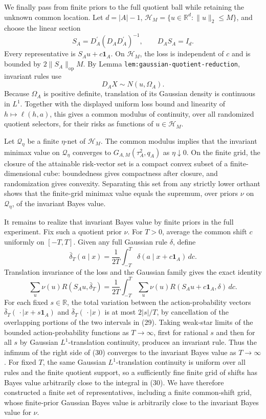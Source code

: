 We finally pass from finite priors to the full quotient ball while retaining the unknown common location.  Let \(d=|A|-1\), \(\mathcal H_M=\{u\in\mathbb R^d:\lVert u\rVert_2\leq M\}\), and choose the linear section
\[
S_A=D_A^{\prime}(D_AD_A^{\prime})^{-1},
\qquad D_AS_A=I_d.
\tag{27}
\]
Every representative is \(S_Au+c\mathbf1_A\).  On \(\mathcal H_M\), the loss is independent of \(c\) and is bounded by \(2\lVert S_A\rVert_{\mathrm{op}}M\).  By Lemma \texttt{lem:gaussian-quotient-reduction}, invariant rules use
\[
D_AX\sim N(u,\Omega_A).
\tag{28}
\]
Because \(\Omega_A\) is positive definite, translation of its Gaussian density is continuous in \(L^1\).  Together with the displayed uniform loss bound and linearity of \(h\mapsto\ell(h,a)\), this gives a common modulus of continuity, over all randomized quotient selectors, for their risks as functions of \(u\in\mathcal H_M\).

Let \(\mathcal Q_\eta\) be a finite \(\eta\)-net of \(\mathcal H_M\).  The common modulus implies that the invariant minimax value on \(\mathcal Q_\eta\) converges to \(G_{A,M}(\tau_A^2,q_A)\) as \(\eta\downarrow0\).  On the finite grid, the closure of the attainable risk-vector set is a compact convex subset of a finite-dimensional cube: boundedness gives compactness after closure, and randomization gives convexity.  Separating this set from any strictly lower orthant shows that the finite-grid minimax value equals the supremum, over priors \(\nu\) on \(\mathcal Q_\eta\), of the invariant Bayes value.

It remains to realize that invariant Bayes value by finite priors in the full experiment.  Fix such a quotient prior \(\nu\).  For \(T>0\), average the common shift \(c\) uniformly on \([-T,T]\).  Given any full Gaussian rule \(\delta\), define
\[
\bar\delta_T(a\mid x)=\frac1{2T}\int_{-T}^T
\delta(a\mid x+c\mathbf1_A)\,dc.
\tag{29}
\]
Translation invariance of the loss and the Gaussian family gives the exact identity
\[
\sum_{u}\nu(u)R(S_Au,\bar\delta_T)
=\frac1{2T}\int_{-T}^T\sum_u\nu(u)
R(S_Au+c\mathbf1_A,\delta)\,dc.
\tag{30}
\]
For each fixed \(s\in\mathbb R\), the total variation between the action-probability vectors \(\bar\delta_T(\,\cdot\mid x+s\mathbf1_A)\) and \(\bar\delta_T(\,\cdot\mid x)\) is at most \(2|s|/T\), by cancellation of the overlapping portions of the two intervals in (29).  Taking weak-star limits of the bounded action-probability functions as \(T\to\infty\), first for rational \(s\) and then for all \(s\) by Gaussian \(L^1\)-translation continuity, produces an invariant rule.  Thus the infimum of the right side of (30) converges to the invariant Bayes value as \(T\to\infty\).  For fixed \(T\), the same Gaussian \(L^1\)-translation continuity is uniform over all rules and the finite quotient support, so a sufficiently fine finite grid of shifts has Bayes value arbitrarily close to the integral in (30).  We have therefore constructed a finite set of representatives, including a finite common-shift grid, whose finite-prior Gaussian Bayes value is arbitrarily close to the invariant Bayes value for \(\nu\).

